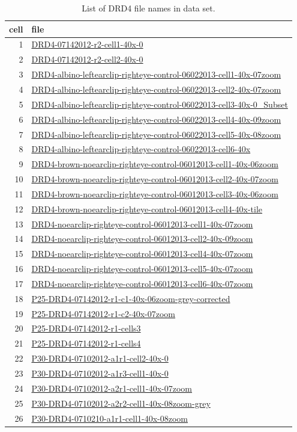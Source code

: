 \documentclass{article}
\begin{document}
\begin{table}
  \centering
  \begin{tabular}{rl}
    \toprule
    cell & file \\
    \midrule
1& \url{DRD4-07142012-r2-cell1-40x-0} \\
2& \url{DRD4-07142012-r2-cell2-40x-0} \\
3&
\url{DRD4-albino-leftearclip-righteye-control-06022013-cell1-40x-07zoom} \\
4&
\url{DRD4-albino-leftearclip-righteye-control-06022013-cell2-40x-07zoom} \\
5&
\url{DRD4-albino-leftearclip-righteye-control-06022013-cell3-40x-0_Subset} \\
6&
\url{DRD4-albino-leftearclip-righteye-control-06022013-cell4-40x-09zoom} \\
7&
\url{DRD4-albino-leftearclip-righteye-control-06022013-cell5-40x-08zoom} \\
8& \url{DRD4-albino-leftearclip-righteye-control-06022013-cell6-40x} \\
9&
\url{DRD4-brown-noearclip-righteye-control-06012013-cell1-40x-06zoom} \\
10&
\url{DRD4-brown-noearclip-righteye-control-06012013-cell2-40x-07zoom} \\
11&
\url{DRD4-brown-noearclip-righteye-control-06012013-cell3-40x-06zoom} \\
12&
\url{DRD4-brown-noearclip-righteye-control-06012013-cell4-40x-tile} \\
13& \url{DRD4-noearclip-righteye-control-06012013-cell1-40x-07zoom} \\
14& \url{DRD4-noearclip-righteye-control-06012013-cell2-40x-09zoom} \\
15& \url{DRD4-noearclip-righteye-control-06012013-cell4-40x-07zoom} \\
16& \url{DRD4-noearclip-righteye-control-06012013-cell5-40x-07zoom} \\
17& \url{DRD4-noearclip-righteye-control-06012013-cell6-40x-07zoom} \\
18& \url{P25-DRD4-07142012-r1-c1-40x-06zoom-grey-corrected} \\
19& \url{P25-DRD4-07142012-r1-c2-40x-07zoom} \\
20& \url{P25-DRD4-07142012-r1-cells3} \\
21& \url{P25-DRD4-07142012-r1-cells4} \\
22& \url{P30-DRD4-07102012-a1r1-cell2-40x-0} \\
23& \url{P30-DRD4-07102012-a1r3-cell1-40x-0} \\
24& \url{P30-DRD4-07102012-a2r1-cell1-40x-07zoom} \\
25& \url{P30-DRD4-07102012-a2r2-cell1-40x-08zoom-grey} \\
26& \url{P30-DRD4-0710210-a1r1-cell1-40x-08zoom} \\
\bottomrule
  \end{tabular}
  \caption{List of DRD4 file names in data set.}

\end{table}
\end{document}
